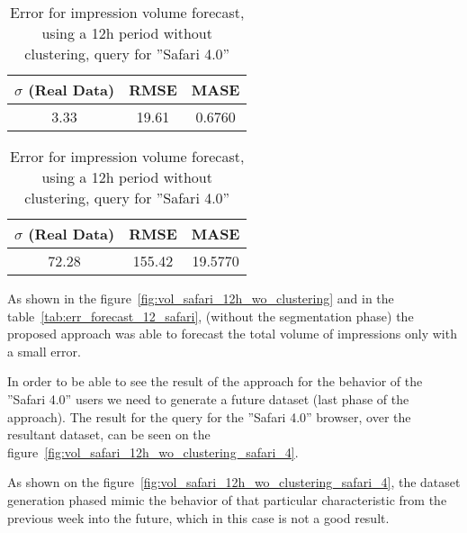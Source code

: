 \begin{table}[!ht]
\centering
\footnotesize
\begin{minipage}[t]{0.45\linewidth}
\centering
\begin{tabular}{ccc}
 $\sigma$ (Real Data) & RMSE & MASE   \\ \hline
 3.33      & 19.61        & 0.6760   \\
\end{tabular}

\vspace{0.5cm}

\caption[Volume
impression forecast, safari]{Error for impression volume
forecast, using a 12h period without clustering}
\label{tab:err_forecast_12_safari}
\end{minipage}
\quad
\begin{minipage}[t]{0.45\linewidth}
\centering
\begin{tabular}{ccc}
 $\sigma$ (Real Data) & RMSE & MASE   \\ \hline
72.28      &  155.42       & 19.5770   \\
\end{tabular}

\vspace{0.5cm}

\caption[Volume
impression forecast, safari]{Error for impression volume
forecast, using a 12h period without clustering, query for ''Safari 4.0''}
\label{tab:err_forecast_12_safari_wo_clustering_safari_4}

\end{minipage}
\end{table}

As shown in the figure~\ref{fig:vol_safari_12h_wo_clustering} and in the
table~\ref{tab:err_forecast_12_safari}, (without the segmentation phase) the
proposed approach was able to forecast the total volume of impressions only with
a small error.

In order to be able to see the result of the approach for the behavior of the
''Safari 4.0'' users we need to generate a future dataset (last phase of the
approach). The result for the query for the ''Safari 4.0'' browser, over the
resultant dataset, can be seen
on the figure~\ref{fig:vol_safari_12h_wo_clustering_safari_4}.

As shown on the figure~\ref{fig:vol_safari_12h_wo_clustering_safari_4}, the
dataset generation phased mimic the behavior of that particular characteristic
from the previous week into the future, which in this case is not a good result.

